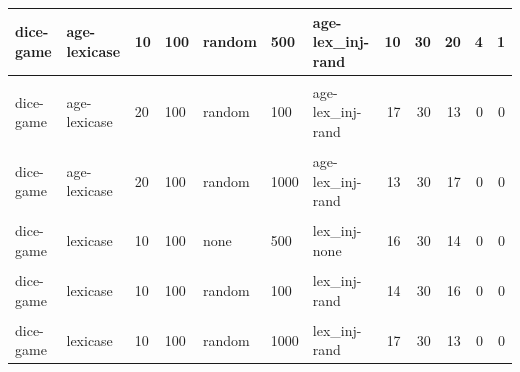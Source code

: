 \documentclass[
]{book}
\begin{document}
\begin{table}
\begin{tabular}{l|l|l|l|l|l|l|r|r|r|r|r}
\hline
dice-game & age-lexicase & 10 & 100 & random & 500 & age-lex\_inj-rand & 10 & 30 & 20 & 4 & 1\\
\hline
\cellcolor{gray!6}{dice-game} & \cellcolor{gray!6}{age-lexicase} & \cellcolor{gray!6}{10} & \cellcolor{gray!6}{100} & \cellcolor{gray!6}{random} & \cellcolor{gray!6}{1000} & \cellcolor{gray!6}{age-lex\_inj-rand} & \cellcolor{gray!6}{15} & \cellcolor{gray!6}{30} & \cellcolor{gray!6}{15} & \cellcolor{gray!6}{9} & \cellcolor{gray!6}{4}\\
\hline
dice-game & age-lexicase & 20 & 100 & random & 100 & age-lex\_inj-rand & 17 & 30 & 13 & 0 & 0\\
\hline
\cellcolor{gray!6}{dice-game} & \cellcolor{gray!6}{age-lexicase} & \cellcolor{gray!6}{20} & \cellcolor{gray!6}{100} & \cellcolor{gray!6}{random} & \cellcolor{gray!6}{500} & \cellcolor{gray!6}{age-lex\_inj-rand} & \cellcolor{gray!6}{13} & \cellcolor{gray!6}{30} & \cellcolor{gray!6}{17} & \cellcolor{gray!6}{1} & \cellcolor{gray!6}{0}\\
\hline
dice-game & age-lexicase & 20 & 100 & random & 1000 & age-lex\_inj-rand & 13 & 30 & 17 & 0 & 0\\
\hline
\cellcolor{gray!6}{dice-game} & \cellcolor{gray!6}{lexicase} & \cellcolor{gray!6}{10} & \cellcolor{gray!6}{100} & \cellcolor{gray!6}{none} & \cellcolor{gray!6}{100} & \cellcolor{gray!6}{lex\_inj-none} & \cellcolor{gray!6}{15} & \cellcolor{gray!6}{30} & \cellcolor{gray!6}{15} & \cellcolor{gray!6}{0} & \cellcolor{gray!6}{0}\\
\hline
dice-game & lexicase & 10 & 100 & none & 500 & lex\_inj-none & 16 & 30 & 14 & 0 & 0\\
\hline
\cellcolor{gray!6}{dice-game} & \cellcolor{gray!6}{lexicase} & \cellcolor{gray!6}{10} & \cellcolor{gray!6}{100} & \cellcolor{gray!6}{none} & \cellcolor{gray!6}{1000} & \cellcolor{gray!6}{lex\_inj-none} & \cellcolor{gray!6}{14} & \cellcolor{gray!6}{30} & \cellcolor{gray!6}{16} & \cellcolor{gray!6}{0} & \cellcolor{gray!6}{0}\\
\hline
dice-game & lexicase & 10 & 100 & random & 100 & lex\_inj-rand & 14 & 30 & 16 & 0 & 0\\
\hline
\cellcolor{gray!6}{dice-game} & \cellcolor{gray!6}{lexicase} & \cellcolor{gray!6}{10} & \cellcolor{gray!6}{100} & \cellcolor{gray!6}{random} & \cellcolor{gray!6}{500} & \cellcolor{gray!6}{lex\_inj-rand} & \cellcolor{gray!6}{14} & \cellcolor{gray!6}{30} & \cellcolor{gray!6}{16} & \cellcolor{gray!6}{0} & \cellcolor{gray!6}{0}\\
\hline
dice-game & lexicase & 10 & 100 & random & 1000 & lex\_inj-rand & 17 & 30 & 13 & 0 & 0\\

\end{tabular}
\end{table}
\end{document}
